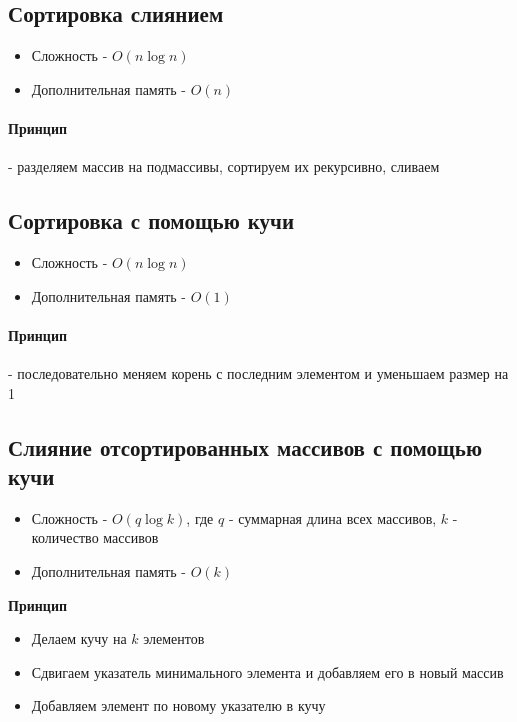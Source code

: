 \documentclass[a4paper,10pt]{article}
\begin{document}
	\subsection{Сортировка слиянием}
	\begin{itemize}
		\item Сложность - $O(n\log n)$
		\item Дополнительная память - $O(n)$
	\end{itemize}
	\paragraph{Принцип} - разделяем массив на подмассивы, сортируем их рекурсивно, сливаем
	\subsection{Сортировка с помощью кучи}
	\begin{itemize}
		\item Сложность - $O(n\log n)$
		\item Дополнительная память - $O(1)$
	\end{itemize}
	\paragraph{Принцип} - последовательно меняем корень с последним элементом и уменьшаем размер на 1
	\subsection{Слияние отсортированных массивов с помощью кучи}
	\begin{itemize}
		\item Сложность - $O(q\log k)$, где $q$ - суммарная длина всех массивов, $k$ - количество массивов
		\item Дополнительная память - $O(k)$
	\end{itemize}
	\begin{center}
		\textbf{Принцип}
	\end{center}
	\begin{itemize}
		\item Делаем кучу на $k$ элементов
		\item Сдвигаем указатель минимального элемента и добавляем его в новый массив
		\item Добавляем элемент по новому указателю в кучу
	\end{itemize}
\end{document}
